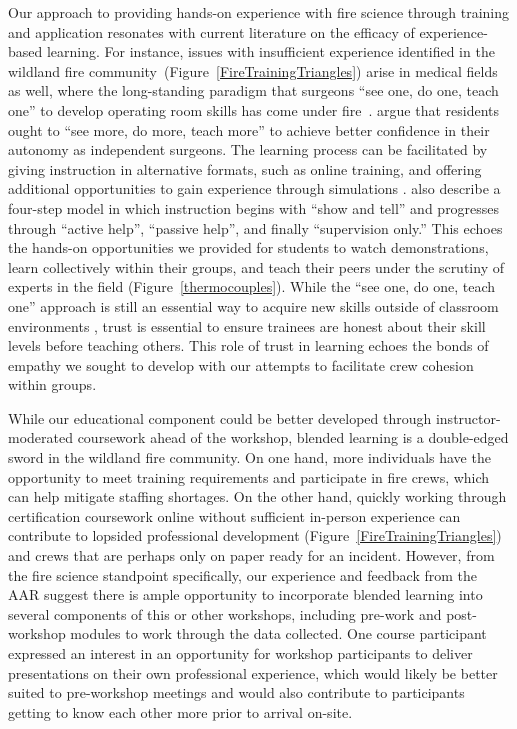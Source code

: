 \documentclass[fire,casereport,accept,moreauthors,pdftex]{Definitions/mdpi}  %
\begin{document}
Our approach to providing hands-on experience with fire science through training and application resonates with current literature on the efficacy of experience-based learning. 
For instance, issues with insufficient experience identified in the wildland fire community~(Figure~\ref{FireTrainingTriangles}) arise in medical fields as well, where the long-standing paradigm that surgeons ``see one, do one, teach one'' to develop operating room skills has come under fire~\citep{zahiri2015}.
\citet{hashimoto2016} argue that residents ought to ``see more, do more, teach more'' to achieve better confidence in their autonomy as independent surgeons. 
The learning process can be facilitated by giving instruction in alternative formats, such as online training, and offering additional opportunities to gain experience through simulations \citep{zahiri2015}.
\citet{george2014} also describe a four-step model in which instruction begins with ``show and tell'' and progresses through ``active help'', ``passive help'', and finally ``supervision only.'' 
This echoes the hands-on opportunities we provided for students to watch demonstrations, learn collectively within their groups, and teach their peers under the scrutiny of experts in the field (Figure~\ref{thermocouples}). 
While the ``see one, do one, teach one'' approach is still an essential way to acquire new skills outside of classroom environments \citep{ayub2022}, trust is essential to ensure trainees are honest about their skill levels before teaching others. 
This role of trust in learning echoes the bonds of empathy \citep{park2020} we sought to develop with our attempts to facilitate crew cohesion within groups. 
 
While our educational component could be better developed through instructor-moderated coursework ahead of the workshop, blended learning is a double-edged sword in the wildland fire community.
On one hand, more individuals have the opportunity to meet training requirements and participate in fire crews, which can help mitigate staffing shortages.
On the other hand, quickly working through certification coursework online without sufficient in-person experience can contribute to lopsided professional development (Figure~\ref{FireTrainingTriangles}) and crews that are perhaps only on paper ready for an incident.
However, from the fire science standpoint specifically, our experience and feedback from the AAR suggest there is ample opportunity to incorporate blended learning into several components of this or other workshops, including pre-work and post-workshop modules to work through the data collected.
One course participant expressed an interest in an opportunity for workshop participants to deliver presentations on their own professional experience, which would likely be better suited to pre-workshop meetings and would also contribute to participants getting to know each other more prior to arrival on-site.
\end{document}
